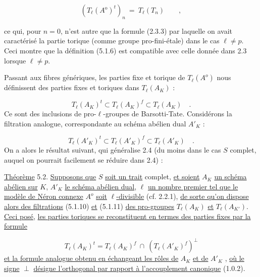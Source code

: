 \begin{equation}\tag{5.1.9}
(T_\ell(A^{\mathrm{o}})^t)_n \ = \ T_\ell(T_n) \qquad ,
\end{equation}


ce qui, pour $n=0$, n'est autre que la formule (2.3.3) par laquelle on avait caractérisé la partie torique (comme groupe pro-fini-étale) dans le cas $\ell \neq p$. Ceci montre que la définition (5.1.6) est compatible avec celle donnée dans 2.3 lorsque $\ell \neq p$.

Passant aux fibres génériques, les parties fixe et torique de $T_\ell(A^o)$ nous définissent des parties fixes et toriques dans $T_\ell(A_K)$ :

\begin{equation}\tag{5.1.10}
T_\ell(A_K)^t \subset T_\ell(A_K)^f \subset T_\ell(A_K) \quad .
\end{equation}
Ce sont des inclusions de pro-$\ell$-groupes de Barsotti-Tate. Considérons la filtration analogue, correspondante au schéma abélien dual $A'_K$ :

\begin{equation}\tag{5.1.11}
T_\ell(A'_K)^t \subset T_\ell(A'_K)^f \subset T_\ell(A'_K) \quad .
\end{equation}
On a alors le résultat suivant, qui généralise 2.4 (du moins dans le cas $S$ complet, auquel on pourrait facilement se réduire dans 2.4) :

\underline{Théorème} 5.2. \underline{Supposons que} $S$ \underline{soit un trait} complet, \underline{et soient} $A_K$ \underline{un schéma abélien sur} $K$, $A'_K$ \underline{le schéma abélien dual}, $\ell$ \underline{un nombre premier tel que le modèle de Néron connexe} $A^o$ \underline{soit} $\ell$\underline{-divisible} (cf. 2.2.1), \underline{de sorte qu'on dispose alors des filtrations} (5.1.10) \underline{et} (5.1.11) \underline{des pro-groupes} $T_\ell(A_K)$ \underline{et} $T_\ell(A_{K'})$. \underline{Ceci posé}, \underline{les parties toriques se reconstituent en termes des parties fixes par la formule}

\begin{equation}\tag{5.2.1}
T_\ell(A_K)^t = T_\ell(A_K)^f \ \cap \ (T_\ell(A'_K)^f)^\perp
\end{equation}
\underline{et la formule analogue obtenu en échangeant les rôles de} $A_K$ \underline{et de} $A'_K$ , \underline{où le signe} $\perp$ \underline{désigne l'orthogonal par rapport à l'accouplement canonique} (1.0.2).



